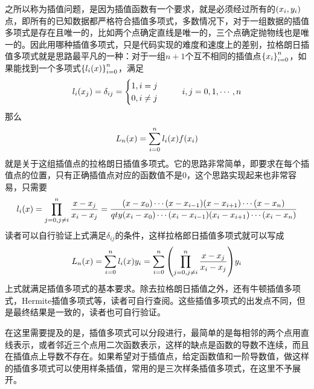 \documentclass[12pt,a4paper,openany,twoside]{book}
\numberwithin{equation}{section}
\begin{document}
            之所以称为插值问题，是因为插值函数有一个要求，就是必须经过所有的$\qty(x_i,y_i)$点，即所有的已知数据都严格符合插值多项式，多数情况下，对于一组数据的插值多项式是存在且唯一的，比如两个点确定直线是唯一的，三个点确定抛物线也是唯一的。因此用哪种插值多项式，只是代码实现的难度和速度上的差别，拉格朗日插值多项式就是思路最平凡的一种：对于一组$n+1$个互不相同的插值点$\qty{x_i}_{i=0}^n$，如果能找到一个多项式$\qty{l_{i}\qty(x)}_{i=0}^{n}$，满足
            \begin{equation}
              l_{i}\qty(x_{j})=\delta_{i j}=\begin{cases}
                1, i=j \\
                0, i \neq j 
              \end{cases}\ \ \ \ \ i, j=0,1, \cdots, n
            \end{equation}
            那么
            \begin{equation}
              L_{n}\qty(x)=\sum_{i=0}^{n}{l_{i}\qty(x) f\qty(x_{i})}
            \end{equation}
            就是关于这组插值点的拉格朗日插值多项式。它的思路非常简单，即要求在每个插值点的位置，只有正确插值点对应的函数值不是0，这个思路实现起来也非常容易，只需要
            \begin{equation}
              l_{i}(x)=\prod_{j=0, j \neq i}^n{\frac{x-x_j}{x_i-x_j}}=\frac{\qty(x-x_0)\cdots\qty(x-x_{i-1})\qty(x-x_{i+1})\cdots\qty(x-x_{n})}{qty(x_{i}-x_0)\cdots\qty(x_i-x_{i-1})\qty(x_i-x_{i+1})\cdots\qty(x_i-x_{n})}
            \end{equation}
            读者可以自行验证上式满足$\delta_{ij}$的条件，这样拉格郎日插值多项式就可以写成
            \begin{equation}
              L_{n}\qty(x)=\sum_{i=0}^n{l_{i}\qty(x) y_i}=\sum_{i=0}^{n}{\qty(\prod_{j=0, j \neq i}^n \frac{x-x_j}{x_i-x_j}) y_i}
            \end{equation}
            上式就满足插值多项式的基本要求。除去拉格朗日插值之外，还有牛顿插值多项式，Hermite插值多项式等，读者可自行查阅。这些插值多项式的出发点不同，但是最终结果是一致的，读者也可自行验证。
            
            在这里需要提及的是，插值多项式可以分段进行，最简单的是每相邻的两个点用直线表示，或者邻近三个点用二次函数表示，这样的缺点是函数的导数不连续，而且在插值点上导数不存在。如果希望对于插值点，给定函数值和一阶导数值，做这样的插值多项式可以使用样条插值，常用的是三次样条插值多项式，在这里不予展开。
\end{document}

